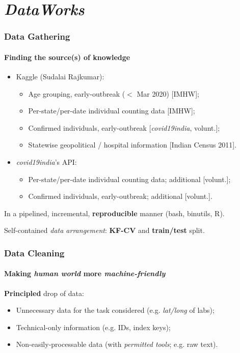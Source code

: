 \documentclass{beamer}
\begin{document}
\section{\textit{DataWorks}}{
\begin{frame}
	\frametitle{Data Gathering}
	\framesubtitle{Finding the source(s) of knowledge}
		\begin{itemize}
			\item{
				Kaggle (Sudalai Rajkumar):
				\begin{itemize}
					\item{Age grouping, early-outbreak ($<$ Mar 2020) [IMHW];}
					\item{Per-state/per-date individual counting data [IMHW];}
					\item{Confirmed individuals, early-outbreak [\textit{covid19india}, volunt.];}
					\item{Statewise geopolitical / hospital information [Indian Census 2011].}
				\end{itemize}
			}
		\hfill
		\item{
	\textit{covid19india}'s API:
	\begin{itemize}
		\item{Per-state/per-date individual counting data; additional [volunt.];}
		\item{Confirmed individuals, early-outbreak; additional [volunt.].}
	\end{itemize}
}
		\end{itemize}

	\hfill\break
	In a pipelined, incremental, \textbf{reproducible} manner (\textsf{bash}, \textsf{binutils}, \textsf{R}).

	\hfill\break

	Self-contained \textit{data arrangement}: \textbf{KF-CV} and \textbf{train/test} split.

\end{frame}

\begin{frame}
	\frametitle{Data Cleaning}
	\framesubtitle{Making \textit{human world} more \textit{machine-friendly}}

	\textbf{Principled} drop of data:
	\begin{itemize}
		\item{Unnecessary data for the task considered (e.g. \textit{lat/long} of labs);}
		\item{Technical-only information (e.g. IDs, index keys);}
		\item{Non-easily-processable data (with \textit{permitted tools}; e.g. raw text).}
	\end{itemize}


\end{frame}}
\end{document}
